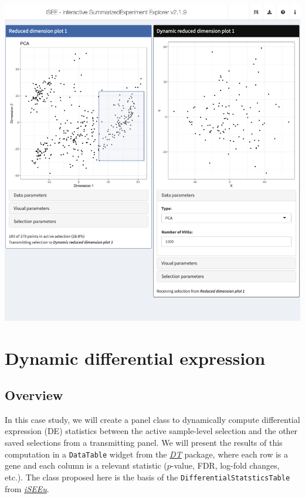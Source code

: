 \documentclass[
]{book}
\begin{document}
\includegraphics[width=1\linewidth]{screenshots/adaptive-dimred}

\hypertarget{dynamic-differential-expression}{%
\chapter{Dynamic differential expression}\label{dynamic-differential-expression}}

\hypertarget{overview}{%
\section{Overview}\label{overview}}

In this case study, we will create a panel class to dynamically compute differential expression (DE) statistics between the active sample-level selection and the other saved selections from a transmitting panel.
We will present the results of this computation in a \texttt{DataTable} widget from the \emph{\href{https://CRAN.R-project.org/package=DT}{DT}} package, where each row is a gene and each column is a relevant statistic (\(p\)-value, FDR, log-fold changes, etc.).
The class proposed here is the basis of the \texttt{DifferentialStatsticsTable} from \emph{\href{https://bioconductor.org/packages/3.11/iSEEu}{iSEEu}}.
\end{document}
